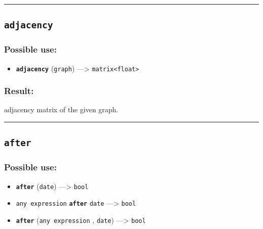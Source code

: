 \documentclass[]{book}
\providecommand{\tightlist}{%
  \setlength{\itemsep}{0pt}\setlength{\parskip}{0pt}}
\theoremstyle{definition}
\theoremstyle{definition}
\theoremstyle{definition}
\theoremstyle{remark}
\begin{document}
\begin{center}\rule{0.5\linewidth}{\linethickness}\end{center}

\subsection{\texorpdfstring{\texttt{adjacency}}{adjacency}}\label{adjacency}

\subsubsection{Possible use:}\label{possible-use-23}

\begin{itemize}
\tightlist
\item
  \textbf{\texttt{adjacency}} (\texttt{graph}) ---\textgreater{}
  \texttt{matrix\textless{}float\textgreater{}}
\end{itemize}

\subsubsection{Result:}\label{result-22}

adjacency matrix of the given graph.

\begin{center}\rule{0.5\linewidth}{\linethickness}\end{center}

\subsection{\texorpdfstring{\texttt{after}}{after}}\label{after}

\subsubsection{Possible use:}\label{possible-use-24}

\begin{itemize}
\tightlist
\item
  \textbf{\texttt{after}} (\texttt{date}) ---\textgreater{}
  \texttt{bool}
\item
  \texttt{any\ expression} \textbf{\texttt{after}} \texttt{date}
  ---\textgreater{} \texttt{bool}
\item
  \textbf{\texttt{after}} (\texttt{any\ expression} , \texttt{date})
  ---\textgreater{} \texttt{bool}
\end{itemize}
\end{document}
